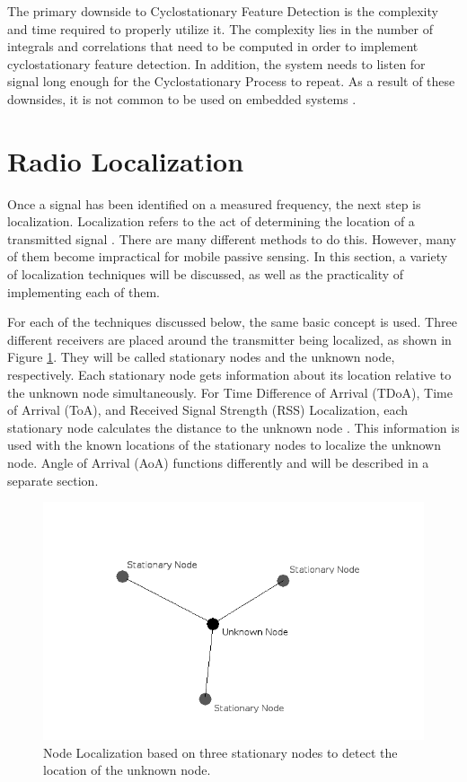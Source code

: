 The primary downside to Cyclostationary Feature Detection is the complexity and time required to properly utilize it. The complexity lies in the number of integrals and correlations that need to be computed in order to implement cyclostationary feature detection. In addition, the system needs to listen for signal long enough for the Cyclostationary Process to repeat. As a result of these downsides, it is not common to be used on embedded systems \cite{cyclostat_cons}. \par


\section{Radio Localization} \label{back:radio_loc}
Once a signal has been identified on a measured frequency, the next step is localization. Localization refers to the act of determining the location of a transmitted signal \cite{local_conf}. There are many different methods to do this. However, many of them become impractical for mobile passive sensing. In this section, a variety of localization techniques will be discussed, as well as the practicality of implementing each of them.\par
For each of the techniques discussed below, the same basic concept is used. Three different receivers are placed around the transmitter being localized, as shown in Figure \ref{fig:node_localization}.  They will be called stationary nodes and the unknown node, respectively. Each stationary node gets information about its location relative to the unknown node simultaneously. For Time Difference of Arrival (TDoA), Time of Arrival (ToA), and Received Signal Strength (RSS) Localization, each stationary node calculates the distance to the unknown node \cite{local_conf}. This information is used with the known locations of the stationary nodes to localize the unknown node. Angle of Arrival (AoA) \cite{local_aoa} functions differently and will be described in a separate section. \par

\begin{figure}[ht]
\centering
\includegraphics[scale=0.5]{img/node-localization-lines.png}
\caption{Node Localization based on three stationary nodes to detect the location of the unknown node.}
\label{fig:node_localization}
\end{figure}\par

